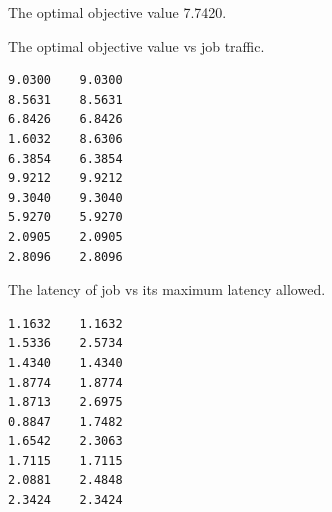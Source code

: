 \documentclass{article}
\begin{document}
The optimal objective value 7.7420.

The optimal objective value vs job traffic.
\begin{verbatim}	
9.0300    9.0300
8.5631    8.5631
6.8426    6.8426
1.6032    8.6306
6.3854    6.3854
9.9212    9.9212
9.3040    9.3040
5.9270    5.9270
2.0905    2.0905
2.8096    2.8096	
\end{verbatim}	


The latency of job vs its maximum latency allowed.
\begin{verbatim}	
1.1632    1.1632
1.5336    2.5734
1.4340    1.4340
1.8774    1.8774
1.8713    2.6975
0.8847    1.7482
1.6542    2.3063
1.7115    1.7115
2.0881    2.4848
2.3424    2.3424
\end{verbatim}	
\end{document}
